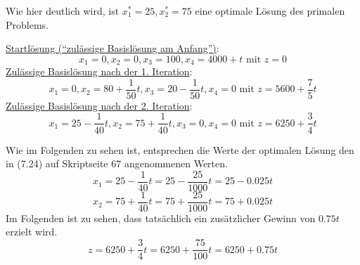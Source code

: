 \documentclass[10pt,a4paper,oneside,ngerman,numbers=noenddot]{scrartcl}
\begin{document}
			Wie hier deutlich wird, ist $x_{1}^{*} = 25, x_{2}^{*} = 75$ eine optimale Lösung des primalen Problems.
			
			\underline{Startlösung ("`zulässige Basislösung am Anfang"')}:
			\[
				x_{1} = 0, x_{2} = 0, x_{3} = 100, x_{4} = 4000 + t \text{ mit } z = 0
			\]
			\underline{Zulässige Basislösung nach der 1. Iteration}:
			\[
				x_{1} = 0, x_{2} = 80 + \frac{1}{50}t, x_{3} = 20 - \frac{1}{50}t, x_{4} = 0 \text{ mit } z = 5600 + \frac{7}{5}t
			\]
			\underline{Zulässige Basislösung nach der 2. Iteration}:
			\[
				x_{1} = 25 - \frac{1}{40}t, x_{2} = 75 + \frac{1}{40}t, x_{3} = 0, x_{4} = 0 \text{ mit } z = 6250 + \frac{3}{4}t
			\]
			
			Wie im Folgenden zu sehen ist, entsprechen die Werte der optimalen Lösung den in (7.24) auf Skriptseite 67 angenommenen Werten.
			\[
				x_{1} = 25 - \frac{1}{40}t = 25 - \frac{25}{1000}t = 25 - 0.025t
			\]
			\[
				x_{2} = 75 + \frac{1}{40}t = 75 + \frac{25}{1000}t = 75 + 0.025t
			\]
			Im Folgenden ist zu sehen, dass tatsächlich ein zusätzlicher Gewinn von $0.75t$ erzielt wird.
			\[
				z = 6250 + \frac{3}{4}t = 6250 + \frac{75}{100}t = 6250 + 0.75t
			\]
\end{document}
